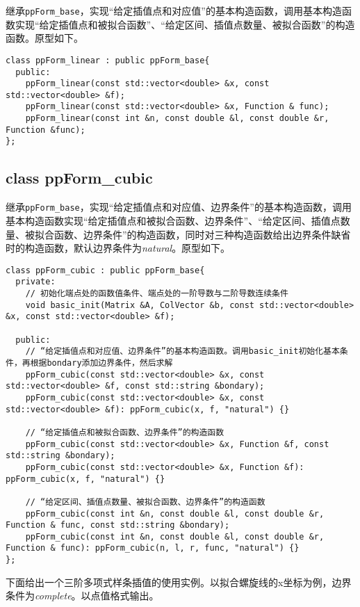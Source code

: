 \documentclass[lang=cn,11pt,a4paper]{elegantpaper}
\begin{document}
继承\verb|ppForm_base|，实现“给定插值点和对应值”的基本构造函数，调用基本构造函数实现“给定插值点和被拟合函数”、“给定区间、插值点数量、被拟合函数”的构造函数。原型如下。

\begin{lstlisting}
class ppForm_linear : public ppForm_base{
  public:
    ppForm_linear(const std::vector<double> &x, const std::vector<double> &f);
    ppForm_linear(const std::vector<double> &x, Function & func);
    ppForm_linear(const int &n, const double &l, const double &r, Function &func);
};
\end{lstlisting}

\subsection{class ppForm\_cubic}

继承\verb|ppForm_base|，实现“给定插值点和对应值、边界条件”的基本构造函数，调用基本构造函数实现“给定插值点和被拟合函数、边界条件”、“给定区间、插值点数量、被拟合函数、边界条件”的构造函数，同时对三种构造函数给出边界条件缺省时的构造函数，默认边界条件为\textit{natural}。原型如下。

\begin{lstlisting}
class ppForm_cubic : public ppForm_base{
  private:
    // 初始化端点处的函数值条件、端点处的一阶导数与二阶导数连续条件
    void basic_init(Matrix &A, ColVector &b, const std::vector<double> &x, const std::vector<double> &f);

  public:
    // “给定插值点和对应值、边界条件”的基本构造函数。调用basic_init初始化基本条件，再根据bondary添加边界条件，然后求解
    ppForm_cubic(const std::vector<double> &x, const std::vector<double> &f, const std::string &bondary);
    ppForm_cubic(const std::vector<double> &x, const std::vector<double> &f): ppForm_cubic(x, f, "natural") {}

    // “给定插值点和被拟合函数、边界条件”的构造函数
    ppForm_cubic(const std::vector<double> &x, Function &f, const std::string &bondary);
    ppForm_cubic(const std::vector<double> &x, Function &f): ppForm_cubic(x, f, "natural") {}

    // “给定区间、插值点数量、被拟合函数、边界条件”的构造函数
    ppForm_cubic(const int &n, const double &l, const double &r, Function & func, const std::string &bondary);
    ppForm_cubic(const int &n, const double &l, const double &r, Function & func): ppForm_cubic(n, l, r, func, "natural") {}
};
\end{lstlisting}

下面给出一个三阶多项式样条插值的使用实例。以拟合螺旋线的x坐标为例，边界条件为\textit{complete}。以点值格式输出。
\end{document}
